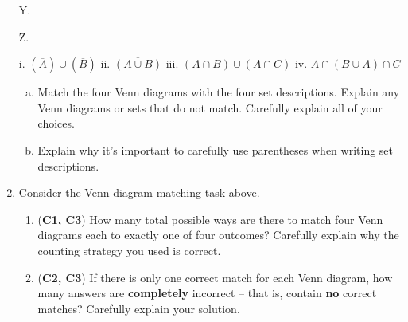 \documentclass[12pt]{article}
\def\firstcircle{(90:1cm) circle (1.5cm)}
\def\secondcircle{(210:1cm) circle (1.5cm)}
\def\thirdcircle{(330:1cm) circle (1.5cm)}
\def\universer{(-3, -2.5) rectangle (3, 2.75)}
\begin{document}
\begin{enumerate}
\hfill
Y.
\hfill
Z. 

i. $(\overline{A}) \cup (\overline{B})$
\hfill
ii. $\overline{(A \cup B)}$
\hfill
iii. $(A\cap B) \cup (A \cap C)$
\hfill
iv. $A\cap (B\cup A) \cap C$

\begin{enumerate}[(a)]
    \item Match the four Venn diagrams with the four set descriptions. Explain any Venn diagrams or sets that do not match. Carefully explain all of your choices.
    
   
    \item Explain why it's important to carefully use parentheses when writing set descriptions.
    
\end{enumerate}

\item Consider the Venn diagram matching task above.
\begin{enumerate}
    \item (\textbf{C1, C3}) How many total possible ways are there to match four Venn diagrams each to exactly one of four outcomes? Carefully explain why the counting strategy you used is correct.
    
    
    \item (\textbf{C2, C3}) If there is only one correct match for each Venn diagram, how many answers are \textbf{completely} incorrect -- that is, contain \textbf{no} correct matches? Carefully explain your solution.
    

\end{enumerate}
\end{enumerate}
\end{document}
